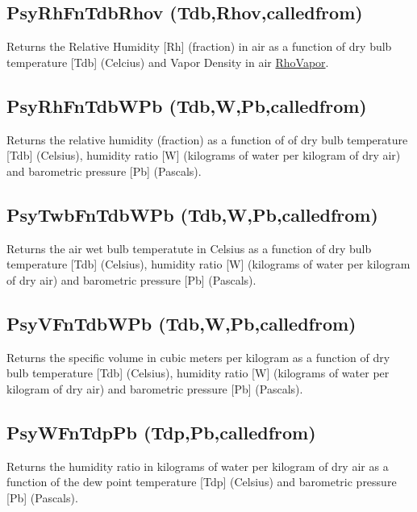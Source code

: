 \subsection{PsyRhFnTdbRhov (Tdb,Rhov,calledfrom)}\label{psyrhfntdbrhov-tdbrhovcalledfrom}

Returns the Relative Humidity {[}Rh{]} (fraction) in air as a function of dry bulb temperature {[}Tdb{]} (Celcius) and Vapor Density in air \href{kilograms\%20of\%20water\%20per\%20cubic\%20meter\%20of\%20air}{RhoVapor}.

\subsection{PsyRhFnTdbWPb (Tdb,W,Pb,calledfrom)}\label{psyrhfntdbwpb-tdbwpbcalledfrom}

Returns the relative humidity (fraction) as a function of of dry bulb temperature {[}Tdb{]} (Celsius), humidity ratio {[}W{]} (kilograms of water per kilogram of dry air) and barometric pressure {[}Pb{]} (Pascals).

\subsection{PsyTwbFnTdbWPb (Tdb,W,Pb,calledfrom)}\label{psytwbfntdbwpb-tdbwpbcalledfrom}

Returns the air wet bulb temperatute in Celsius as a function of dry bulb temperature {[}Tdb{]} (Celsius), humidity ratio {[}W{]} (kilograms of water per kilogram of dry air) and barometric pressure {[}Pb{]} (Pascals).

\subsection{PsyVFnTdbWPb (Tdb,W,Pb,calledfrom)}\label{psyvfntdbwpb-tdbwpbcalledfrom}

Returns the specific volume in cubic meters per kilogram as a function of dry bulb temperature {[}Tdb{]} (Celsius), humidity ratio {[}W{]} (kilograms of water per kilogram of dry air) and barometric pressure {[}Pb{]} (Pascals).

\subsection{PsyWFnTdpPb (Tdp,Pb,calledfrom)}\label{psywfntdppb-tdppbcalledfrom}

Returns the humidity ratio in kilograms of water per kilogram of dry air as a function of the dew point temperature {[}Tdp{]} (Celsius) and barometric pressure {[}Pb{]} (Pascals).

